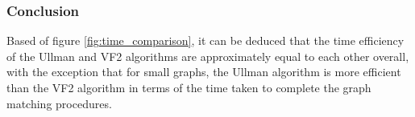 \subsubsection{Conclusion}
Based of figure \ref{fig:time_comparison}, it can be deduced that the time efficiency of the Ullman and VF2 algorithms are approximately equal to each other overall,
with the exception that for small graphs, the Ullman algorithm is more efficient than the VF2 algorithm in terms of the time taken to complete the graph matching
procedures.